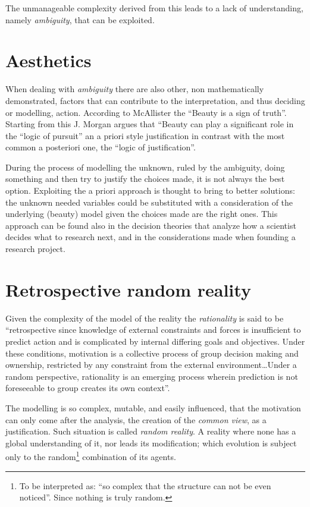 The unmanageable complexity derived from this leads to a lack of understanding, namely
\textit{ambiguity}, that can be exploited.


\section{Aesthetics}
When dealing with \textit{ambiguity} there are also other, non mathematically demonstrated, factors that can contribute to the interpretation, and thus deciding or modelling, action.
According to McAllister the ``Beauty is a sign of truth''\cite{McAllister96,McAllister98}.
Starting from this J. Morgan argues that ``Beauty can play a significant role in the
``logic of pursuit''\cite{JMorgan} an a priori style justification in contrast
with the most common a posteriori one, the ``logic of justification''.

During the process of modelling  the unknown, ruled by the ambiguity, doing something and then
try to justify the choices made, it is not always the best option.
Exploiting the a priori approach is thought to bring to better solutions:
the unknown needed variables could be substituted with a consideration of the
underlying (beauty) model given the choices made are
the right ones.
This approach can be found also in the decision theories that analyze
how a scientist decides what to research next, and in the considerations made
when founding a research project\cite{JMorgan}.


\section{Retrospective random reality}
Given the complexity of the model of the reality the \textit{rationality}
is said to be ``retrospective since knowledge of external constraints and forces
is insufficient to predict action and is complicated by internal differing goals
and objectives. Under these conditions, motivation is a collective process of
group decision making and ownership, restricted by any constraint from the
external environment\dots{}Under a random perspective, rationality is an emerging process wherein prediction is not foreseeable to group creates its own context''\cite{Personell}.

The modelling is so complex, mutable, and easily influenced, that the motivation can only come after the analysis, the creation of the \textit{common view}, as a justification.
Such situation is called \textit{random reality}. A reality where none has a
global understanding of it, nor leads its modification; which evolution is
subject only to the random\footnote{To be interpreted as: ``so complex that
the structure can not be even noticed''. Since nothing is truly random.}
combination of its agents.

